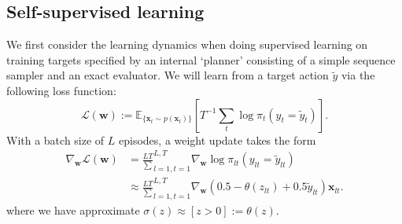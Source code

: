 \documentclass{article}
\renewcommand\b\bm
\begin{document}
\subsection*{Self-supervised learning}

We first consider the learning dynamics when doing supervised learning on training targets specified by an internal `planner' consisting of a simple sequence sampler and an exact evaluator.
We will learn from a target action $\tilde{y}$ via the following loss function:
\begin{equation}
    \mathcal{L}(\b{w}) := \mathbb{E}_{ \{ \b{x}_t \sim p(\b{x}_t) \} } \left [ T^{-1} \sum_t \log \pi_t (y_t = \tilde{y}_t) \right ].
\end{equation}
With a batch size of $L$ episodes, a weight update takes the form
\begin{align}
    \nabla_{\b{w}} \mathcal{L}(\b{w}) &= \frac{L T} \sum_{l=1, t=1}^{L, T} \nabla_{\b{w}} \log \pi_{lt} (y_{lt} = \tilde{y}_{lt}) \\
    &\approx \frac{L T} \sum_{l=1, t=1}^{L, T} \nabla_{\b{w}} (0.5-\theta(z_{lt})+0.5 \tilde{y}_{lt}) \b{x}_{lt}.
\end{align}
where we have approximate $\sigma(z) \approx [z > 0] := \theta(z)$.
\end{document}
